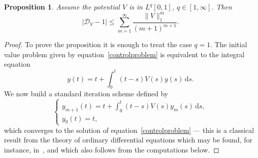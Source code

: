 \documentclass[10pt,a4paper]{amsart}
\providecommand{\dpl}{\displaystyle}
\theoremstyle{plain}
\newtheorem{prop}[theorem]{Proposition}
\theoremstyle{definition}
\newcommand{\DD}{\mathscr{D}}
\renewcommand{\d}{\mathrm{d}}
\let\balpha q
\begin{document}
\begin{prop}\label{thmupperbound}
Assume the potential $V$ is in $L^{\balpha}[0,1]$, $\balpha \in [1,\infty]$.
Then
\[
\left| \DD_V-1\right|\leq \sum_{m=1}^{\infty} \frac{ \|V\|_{1}^{m}}{ (m+1)^{m+1}}.
\]
\end{prop}
\begin{proof}
To prove the proposition it is enough to treat the case $\balpha=1$.
The initial value problem given by equation~\eqref{controlproblem} is equivalent to the integral equation
\[
y(t) = t + {\int_{0}^{t}}(t-s)V(s)y(s) \, \d s.
\]
We now build a standard iteration scheme defined by
\begin{equation}\label{iterationsch}
\begin{cases}
y_{m+1}(t)=t+\dpl\int_{0}^{t}(t-s)V(s)y_{m}(s) \, \d s,\\
y_{0}(t)=t,
\end{cases}
\end{equation}
which converges to the solution of equation~\eqref{controlproblem} --- this is a classical result from the theory of ordinary differential
equations which may be found, for instance, in~\cite{CL}, and which also follows from the computations below.


\end{proof}
\end{document}
